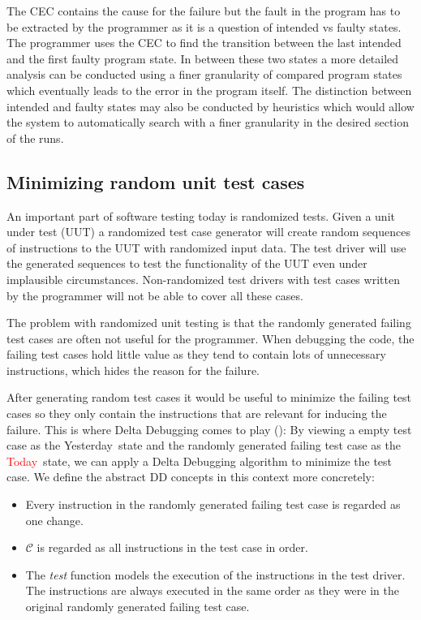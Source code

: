 \documentclass[a4paper,UKenglish]{lipics-v2018}
\newcommand{\green}[1]{\textcolor{td-green}{#1}}
\newcommand{\red}[1]{\textcolor{red}{#1}}
\newcommand{\yd}[0]{\green{Yesterday}}
\newcommand{\td}[0]{\red{Today}}
\newcommand{\C}[0]{\ensuremath{\mathcal{C}}}
\begin{document}
The CEC contains the cause for the failure but the fault in the program has to be extracted by the programmer as it is a question of intended vs faulty states. The programmer uses the CEC to find the transition between the last intended and the first faulty program state. In between these two states a more detailed analysis can be conducted using a finer granularity of compared program states which eventually leads to the error in the program itself. The distinction between intended and faulty states may also be conducted by heuristics which would allow the system to automatically search with a finer granularity in the desired section of the runs.



\subsection{Minimizing random unit test cases}

An important part of software testing today is randomized tests. Given a unit under test (UUT) a randomized test case generator will create random sequences of instructions to the UUT with randomized input data. The test driver will use the generated sequences to test the functionality of the UUT even under implausible circumstances. Non-randomized test drivers with test cases written by the programmer will not be able to cover all these cases.

The problem with randomized unit testing is that the randomly generated failing test cases are often not useful for the programmer. When debugging the code, the failing test cases hold little value as they tend to contain lots of unnecessary instructions, which hides the reason for the failure. 

After generating random test cases it would be useful to minimize the failing test cases so they only contain the instructions that are relevant for inducing the failure. This is where Delta Debugging comes to play (\cite{Lei:2005:MRU:1104997.1105255}): By viewing a empty test case as the \yd\ state and the randomly generated failing test case as the \td\ state, we can apply a Delta Debugging algorithm to minimize the test case. We define the abstract DD concepts in this context more concretely:

\begin{itemize}
	\item Every instruction in the randomly generated failing test case is regarded as one change.
	\item $\C$ is regarded as all instructions in the test case in order.
	\item The \textit{test} function models the execution of the instructions in the test driver. The instructions are always executed in the same order as they were in the original randomly generated failing test case. 
\end{itemize}
\end{document}
